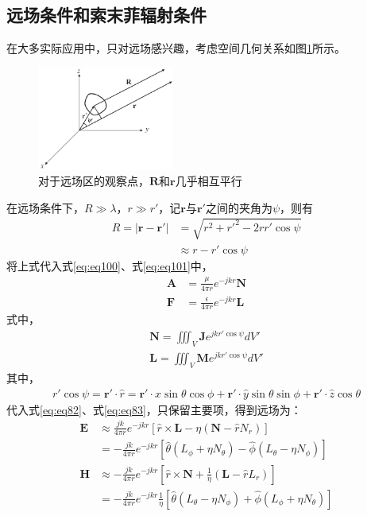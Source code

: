 \documentclass{article}
\numberwithin{equation}{section}
\renewcommand{\vec}[1]{\boldsymbol{#1}}
\begin{document}
\subsection{远场条件和索末菲辐射条件}
在大多实际应用中，只对远场感兴趣，考虑空间几何关系如图\ref{fig:fig0}所示。\par
\begin{figure}[ht]
    \centering
    \includegraphics[width=0.4\textwidth]{远场条件.PNG}
    \caption{对于远场区的观察点，$\mathbf{R}$和$\vec{r}$几乎相互平行}
    \label{fig:fig0}
\end{figure}
在远场条件下，$R\gg \lambda$，$r\gg r'$，记$\vec{r}$与$\vec{r}'$之间的夹角为$\psi $，则有
\begin{align}
    \label{eq:eq114}
    R=|\vec{r}-\vec{r}'|&=\sqrt{r^2+r'^2-2rr'\cos \psi} \nonumber \\
                        &\approx r-r'\cos \psi
\end{align}
将上式代入式\ref{eq:eq100}、式\ref{eq:eq101}中，
\begin{align}
    \label{eq:eq115}
    \mathbf{A}&=\frac{\mu}{4\pi r}e^{-jkr}\mathbf{N} \\
    \label{eq:eq116}
    \mathbf{F}&=\frac{\epsilon}{4\pi r}e^{-jkr}\mathbf{L}
\end{align}
式中，
\begin{align}
    \label{eq:eq117}
    \mathbf{N}=\iiint_V\mathbf{J}e^{jkr'\cos\psi}dV' \\
    \label{eq:eq118}
    \mathbf{L}=\iiint_V\mathbf{M}e^{jkr'\cos\psi}dV'
\end{align}
其中，
\begin{align}
    \label{eq:eq121}
    r'\cos\psi=\vec{r}'\cdot\hat{r}=\vec{r}'\cdot\hat{x}\sin\theta\cos\phi+\vec{r}'\cdot\hat{y}\sin\theta\sin\phi+\vec{r}'\cdot\hat{z}\cos\theta
\end{align}
代入式\ref{eq:eq82}、式\ref{eq:eq83}，只保留主要项，得到远场为：
\begin{align}
    \label{eq:eq119}
    \mathbf{E}&\approx\frac{jk}{4\pi r}e^{-jkr}\left[\hat{r}\times\mathbf{L}-\eta\left(\mathbf{N}-\hat{r}N_r\right)\right] \nonumber \\
              &=-\frac{jk}{4\pi r}e^{-jkr}\left[\hat{\theta}\left(L_{\phi}+\eta N_{\theta}\right)-\hat{\phi}\left(L_{\theta}-\eta N_{\phi}\right)\right] \\
    \label{eq:eq120}
    \mathbf{H}&\approx-\frac{jk}{4\pi r}e^{-jkr}\left[\hat{r}\times\mathbf{N}+\frac{1}{\eta}\left(\mathbf{L}-\hat{r}L_r\right)\right] \nonumber \\
              &=-\frac{jk}{4\pi r}e^{-jkr}\frac{1}{\eta}\left[\hat{\theta}\left(L_{\theta}-\eta N_{\phi}\right)+\hat{\phi}\left(L_{\phi}+\eta N_{\theta}\right)\right]
\end{align}
\end{document}
